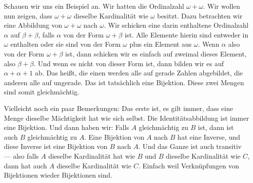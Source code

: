 \begin{spoken-clean}[00:17:00 - 00:18:44]
Schauen wir uns ein Beispiel an. Wir hatten die Ordinalzahl $\omega + \omega$. Wir wollen nun zeigen, dass $\omega + \omega$ dieselbe Kardinalität wie $\omega$ besitzt. Dazu betrachten wir eine Abbildung von $\omega + \omega$ nach $\omega$. Wir schicken eine darin enthaltene Ordinalzahl $\alpha$ auf $\beta + \beta$, falls $\alpha$ von der Form $\omega + \beta$ ist. Alle Elemente hierin sind entweder in $\omega$ enthalten oder sie sind von der Form $\omega$ plus ein Element aus $\omega$. Wenn $\alpha$ also von der Form $\omega + \beta$ ist, dann schicken wir es einfach auf zweimal dieses Element, also $\beta + \beta$. Und wenn es nicht von dieser Form ist, dann bilden wir es auf $\alpha + \alpha + 1$ ab. Das heißt, die einen werden alle auf gerade Zahlen abgebildet, die anderen alle auf ungerade. Das ist tatsächlich eine Bijektion. Diese zwei Mengen sind somit gleichmächtig.

Vielleicht noch ein paar Bemerkungen: Das erste ist, es gilt immer, dass eine Menge dieselbe Mächtigkeit hat wie sich selbst. Die Identitätsabbildung ist immer eine Bijektion. Und dann haben wir: Falls $A$ gleichmächtig zu $B$ ist, dann ist auch $B$ gleichmächtig zu $A$. Eine Bijektion von $A$ nach $B$ hat eine Inverse, und diese Inverse ist eine Bijektion von $B$ nach $A$. Und das Ganze ist auch transitiv --- also falls $A$ dieselbe Kardinalität hat wie $B$ und $B$ dieselbe Kardinalität wie $C$, dann hat auch $A$ dieselbe Kardinalität wie $C$. Einfach weil Verknüpfungen von Bijektionen wieder Bijektionen sind.
\end{spoken-clean}

